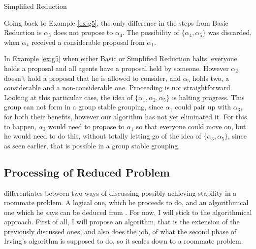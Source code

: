 \documentclass{elsarticle}
\begin{document}
\begin{algorithm}[H]
    \caption{Simplified Reduction\label{alg:sim}}
\end{algorithm}

Going back to Example \ref{ex:g5}, the only difference in the steps from Basic Reduction is $\alpha_5$ does not propose to $\alpha_4$. The possibility of $\{ \alpha_4, \alpha_5 \}$ was discarded, when $\alpha_4$ received a considerable proposal from $\alpha_1$.

In Example \ref{ex:g5} when either Basic or Simplified Reduction halts, everyone holds a proposal and all agents have a proposal held by someone. However $\alpha_2$ doesn't hold a proposal that he is allowed to consider, and $\alpha_5$ holds two, a considerable and a non-considerable one. Proceeding is not straightforward. Looking at this particular case, the idea of $\{ \alpha_1 , \alpha_2 , \alpha_5 \}$ is halting progress. This group can not form in a group stable grouping, since $\alpha_1$ could pair up with $\alpha_3$, for both their benefits, however our algorithm has not yet eliminated it. For this to happen, $\alpha_3$ would need to propose to $\alpha_1$ so that everyone could move on, but he would need to do this, without totally letting go of the idea of $\{ \alpha_3, \alpha_5 \}$, since as seen earlier, that is possible in a group stable grouping.

\subsection{Processing of Reduced Problem}

\cite{tan91} differentiates between two ways of discussing possibly achieving stability in a roommate problem. A logical one, which he proceeds to do, and an algorithmical one which he says can be deduced from \cite{irving85}. For now, I will stick to the algorithmical approach. First of all, I will propose an algorithm, that is the extension of the previously discussed ones, and also does the job, of what the second phase of Irving's algorithm is supposed to do, so it scales down to a roommate problem. 
\end{document}
